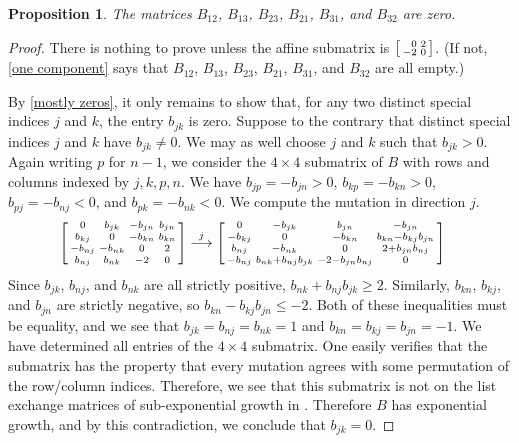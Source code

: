 \documentclass{amsart}
\newtheorem{proposition}{Proposition}[section]
\theoremstyle{definition}
\theoremstyle{remark}
\numberwithin{equation}{section}
\newcommand{\0}{{\mathbf{0}}}
\begin{document}
\begin{proposition}\label{really zero}
The matrices $B_{12}$, $B_{13}$, $B_{23}$, $B_{21}$, $B_{31}$, and $B_{32}$ are zero.
\end{proposition}
\begin{proof}
There is nothing to prove unless the affine submatrix is $\begin{bsmallmatrix*}[r]0&2\\-2&0\end{bsmallmatrix*}$.
(If not, \cref{one component} says that $B_{12}$, $B_{13}$, $B_{23}$, $B_{21}$, $B_{31}$, and $B_{32}$ are all empty.)

By \cref{mostly zeros}, it only remains to show that, for any two distinct special indices $j$ and $k$, the entry $b_{jk}$ is zero.
Suppose to the contrary that distinct special indices $j$ and $k$ have $b_{jk}\neq0$.
We may as well choose $j$ and $k$ such that $b_{jk}>0$.
Again writing $p$ for $n-1$, we consider the $4\times4$ submatrix of $B$ with rows and columns indexed by $j,k,p,n$.
We have $b_{jp}=-b_{jn}>0$, $b_{kp}=-b_{kn}>0$, $b_{pj}=-b_{nj}<0$, and $b_{pk}=-b_{nk}<0$.
We compute the mutation in direction $j$.
\begin{align*}
\begin{bsmallmatrix*}
0&b_{jk}&-b_{jn}&b_{jn}\\
b_{kj}&0&-b_{kn}&b_{kn}\\
-b_{nj}&-b_{nk}&0&2\\
b_{nj}&b_{nk}&-2&0
\end{bsmallmatrix*}
&\overset{j}{\longrightarrow}
\begin{bsmallmatrix*}
0&-b_{jk}&b_{jn}&-b_{jn}\\
-b_{kj}&0&-b_{kn}&b_{kn}-b_{kj}b_{jn}\\
b_{nj}&-b_{nk}&0&2+b_{jn}b_{nj}\\
-b_{nj}&b_{nk}+b_{nj}b_{jk}&-2-b_{jn}b_{nj}&0
\end{bsmallmatrix*}
\end{align*}
Since $b_{jk}$, $b_{nj}$, and $b_{nk}$ are all strictly positive, $b_{nk}+b_{nj}b_{jk}\ge2$.
Similarly, $b_{kn}$, $b_{kj}$, and $b_{jn}$ are strictly negative, so $b_{kn}-b_{kj}b_{jn}\le-2$.
Both of these inequalities must be equality, and we see that $b_{jk}=b_{nj}=b_{nk}=1$ and $b_{kn}=b_{kj}=b_{jn}=-1$.
We have determined all entries of the $4\times 4$ submatrix.
One easily verifies that the submatrix has the property that every mutation agrees with some permutation of the row/column indices.  
Therefore, we see that this submatrix is not on the list exchange matrices of sub-exponential growth in \cite[Theorem~1.1]{FeShThTu12}.
Therefore $B$ has exponential growth, and by this contradiction, we conclude that $b_{jk}=0$.
\end{proof}
\end{document}
